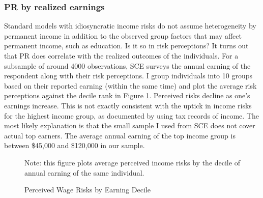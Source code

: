 \subsubsection{PR by realized earnings}

Standard models with idiosyncratic income risks do not assume heterogeneity by permanent income in addition to the observed group factors that may affect permanent income, such as education. Is it so in risk perceptions? It turns out that PR does correlate with the realized outcomes of the individuals. For a subsample of around 4000 observations, SCE surveys the annual earning of the respondent along with their risk perceptions. I group individuals into 10 groups based on their reported earning (within the same time) and plot the average risk perceptions against the decile rank in Figure \ref{fig:barplot_byinc}. Perceived risks decline as one's earnings increase.  This is not exactly consistent with the uptick in income risks for the highest income group, as documented by \cite{bloom2018great} using tax records of income. The most likely explanation is that the small sample I used from SCE does not cover actual top earners. The average annual earning of the top income group is between \$45,000 and \$120,000 in our sample.  

\begin{figure}[!ht]
    	\caption{Perceived Wage Risks by Earning Decile}
    	\label{fig:barplot_byinc}
    	\begin{center}\end{center}
    \begin{flushleft}Note: this figure plots average perceived income risks by the decile of annual earning of the same individual.\end{flushleft}
    \end{figure}